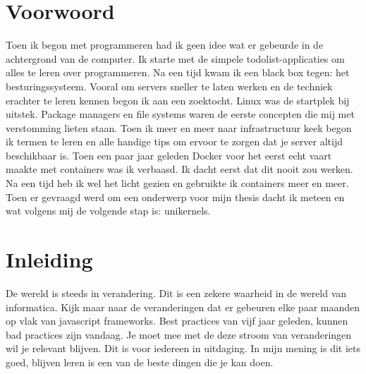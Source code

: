 \documentclass[pdftex,a4paper,12pt,twoside]{report}
\begin{document}
\begin{abstract}
\end{abstract}

\chapter*{Voorwoord}
\label{ch:voorwoord}

Toen ik begon met programmeren had ik geen idee wat er gebeurde in de achtergrond van de computer. Ik starte met de simpele todolist-applicaties om alles te leren over programmeren. Na een tijd kwam ik een black box tegen: het besturingssysteem. Vooral om servers sneller te laten werken en de techniek erachter te leren kennen begon ik aan een zoektocht. Linux was de startplek bij uitstek. Package managers en file systems waren de eerste concepten die mij met verstomming lieten staan. Toen ik meer en meer naar infrastructuur keek begon ik termen te leren en alle handige tips om ervoor te zorgen dat je server altijd beschikbaar is. Toen een paar jaar geleden Docker voor het eerst echt vaart maakte met containers was ik verbaasd. Ik dacht eerst dat dit nooit zou werken. Na een tijd heb ik wel het licht gezien en gebruikte ik containers meer en meer. Toen er gevraagd werd om een onderwerp voor mijn thesis dacht ik meteen en wat volgens mij de volgende stap is: unikernels.



\tableofcontents



\chapter{Inleiding}
\label{ch:inleiding}

De wereld is steeds in verandering. Dit is een zekere waarheid in de wereld van informatica. Kijk maar naar de veranderingen dat er gebeuren elke paar maanden op vlak van javascript frameworks. Best practices van vijf jaar geleden, kunnen bad practices zijn vandaag. Je moet mee met de deze stroom van veranderingen wil je relevant blijven. Dit is voor iedereen in uitdaging. In mijn mening is dit iets goed, blijven leren is een van de beste dingen die je kan doen.
\end{document}
